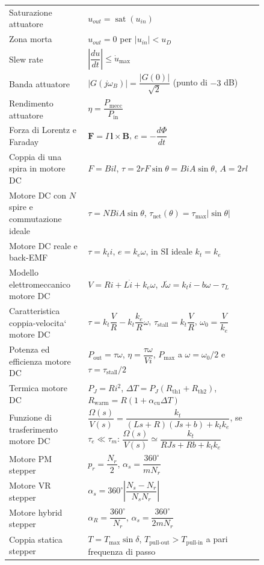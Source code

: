 \documentclass[11pt,a4paper]{article}
\begin{document}
{\begin{longtable}{>{\raggedright\arraybackslash}p{0.24\linewidth}>{\raggedright\arraybackslash}p{0.60\linewidth}}
Saturazione attuatore & $u_{out}=\operatorname{sat}(u_{in})$ \\
Zona morta & $u_{out}=0$ per $|u_{in}|<u_D$ \\
Slew rate & $\left|\dfrac{du}{dt}\right|\le \dot u_{\max}$ \\
Banda attuatore & $|G(j\omega_B)|=\dfrac{|G(0)|}{\sqrt{2}}$ \quad (punto di $-3$ dB) \\
Rendimento attuatore & $\eta=\dfrac{P_{\text{mecc}}}{P_{\text{in}}}$ \\
Forza di Lorentz e Faraday & $\mathbf F=I\,\mathbf l\times \mathbf B$, \quad $e=-\dfrac{d\Phi}{dt}$ \\
Coppia di una spira in motore DC & $F=Bil$, \quad $\tau=2rF\sin\theta=BiA\sin\theta$, \quad $A=2rl$ \\
Motore DC con $N$ spire e commutazione ideale & $\tau=NBiA\sin\theta$, \quad $\tau_{\text{net}}(\theta)=\tau_{\max}|\sin\theta|$ \\
Motore DC reale e back-EMF & $\tau=k_t i$, \quad $e=k_e\omega$, \quad in SI ideale $k_t=k_e$ \\
Modello elettromeccanico motore DC & $V=Ri+L\dot i+k_e\omega$, \quad $J\dot\omega=k_t i-b\omega-\tau_L$ \\
Caratteristica coppia-velocita` motore DC & $\tau=k_t\dfrac{V}{R}-k_t\dfrac{k_e}{R}\omega$, \quad $\tau_{\text{stall}}=k_t\dfrac{V}{R}$, \quad $\omega_0=\dfrac{V}{k_e}$ \\
Potenza ed efficienza motore DC & $P_{\text{out}}=\tau\omega$, \quad $\eta=\dfrac{\tau\omega}{Vi}$, \quad $P_{\max}$ a $\omega=\omega_0/2$ e $\tau=\tau_{\text{stall}}/2$ \\
Termica motore DC & $P_J=Ri^2$, \quad $\Delta T=P_J(R_{\text{th1}}+R_{\text{th2}})$, \quad $R_{\text{warm}}=R(1+\alpha_{\text{cu}}\Delta T)$ \\
Funzione di trasferimento motore DC & $\dfrac{\Omega(s)}{V(s)}=\dfrac{k_t}{(Ls+R)(Js+b)+k_tk_e}$, \quad se $\tau_e\ll\tau_m$: $\dfrac{\Omega(s)}{V(s)}\simeq\dfrac{k_t}{RJs+Rb+k_tk_e}$ \\
Motore PM stepper & $p_r=\dfrac{N_r}{2}$, \quad $\alpha_s=\dfrac{360^\circ}{mN_r}$ \\
Motore VR stepper & $\alpha_s=360^\circ\left|\dfrac{N_s-N_r}{N_sN_r}\right|$ \\
Motore hybrid stepper & $\alpha_R=\dfrac{360^\circ}{N_r}$, \quad $\alpha_s=\dfrac{360^\circ}{2mN_r}$ \\
Coppia statica stepper & $T=T_{\max}\sin\delta$, \quad $T_{\text{pull-out}}>T_{\text{pull-in}}$ a pari frequenza di passo \\

\end{longtable}}
\end{document}
